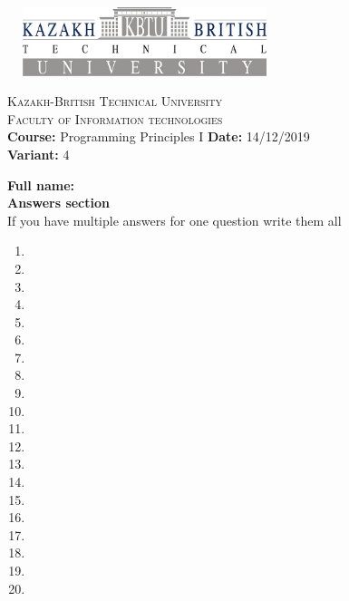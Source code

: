 \documentclass[10pt]{article}
\begin{document}
\begin{center}
\includegraphics[width=8cm, height=2cm]{kbtu.jpg}
\end{center}

\begin{center}
	\begin{minipage}{11.4cm}
		\begin{center}
				{\small \textsc{Kazakh-British Technical University}			\\
						  \textsc{Faculty of Information technologies} \\
                         \textbf{Course:} Programming Principles I \hspace{.65cm}
                         \textbf{Date:} 14/12/2019\\\textbf{Variant:} 4\\
                }
		\end{center}
	\end{minipage}
\end{center}
\textbf{
{Full name:}\\
{Answers section}\\
}
{If you have multiple answers for one question write them all}
\begin{multicols}{5}
\begin{enumerate}
\item \item \item \item \item \item \item \item \item \item \item \item \item \item \item \item \item \item \item \item
\end{enumerate}
\end{multicols}
\end{document}
